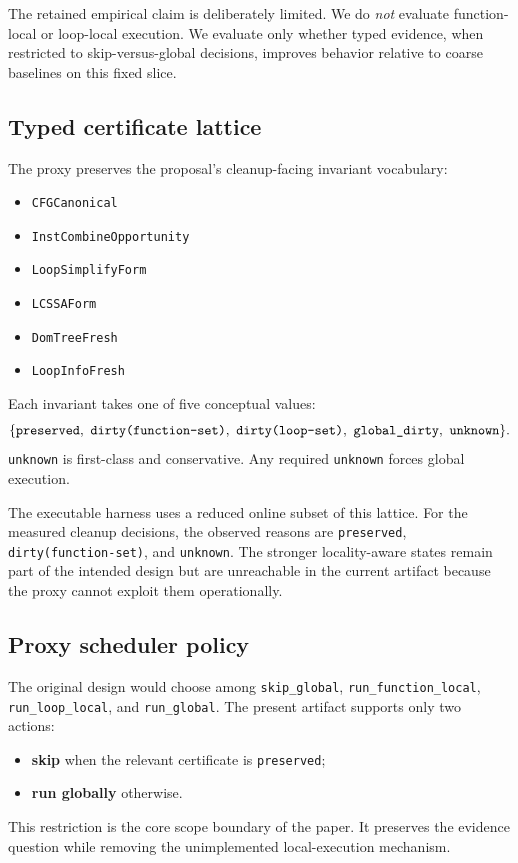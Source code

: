 \documentclass{article}
\begin{document}
The retained empirical claim is deliberately limited. We do \emph{not} evaluate function-local or loop-local execution. We evaluate only whether typed evidence, when restricted to skip-versus-global decisions, improves behavior relative to coarse baselines on this fixed slice.

\subsection{Typed certificate lattice}

The proxy preserves the proposal's cleanup-facing invariant vocabulary:
\begin{itemize}
  \item \texttt{CFGCanonical}
  \item \texttt{InstCombineOpportunity}
  \item \texttt{LoopSimplifyForm}
  \item \texttt{LCSSAForm}
  \item \texttt{DomTreeFresh}
  \item \texttt{LoopInfoFresh}
\end{itemize}
Each invariant takes one of five conceptual values:
\[
\{\texttt{preserved},\ \texttt{dirty(function\mbox{-}set)},\ \texttt{dirty(loop\mbox{-}set)},\ \texttt{global\_dirty},\ \texttt{unknown}\}.
\]
\texttt{unknown} is first-class and conservative. Any required \texttt{unknown} forces global execution.

The executable harness uses a reduced online subset of this lattice. For the measured cleanup decisions, the observed reasons are \texttt{preserved}, \texttt{dirty(function-set)}, and \texttt{unknown}. The stronger locality-aware states remain part of the intended design but are unreachable in the current artifact because the proxy cannot exploit them operationally.

\subsection{Proxy scheduler policy}

The original design would choose among \texttt{skip\_global}, \texttt{run\_function\_local}, \texttt{run\_loop\_local}, and \texttt{run\_global}. The present artifact supports only two actions:
\begin{itemize}
  \item \textbf{skip} when the relevant certificate is \texttt{preserved};
  \item \textbf{run globally} otherwise.
\end{itemize}
This restriction is the core scope boundary of the paper. It preserves the evidence question while removing the unimplemented local-execution mechanism.
\end{document}
